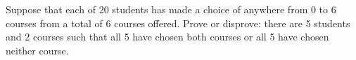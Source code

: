 Suppose that each of 20 students has made a choice of anywhere from 0
to 6 courses from a total of 6 courses offered. Prove or disprove:
there are 5 students and 2 courses such that all 5 have chosen both
courses or all 5 have chosen neither course.
